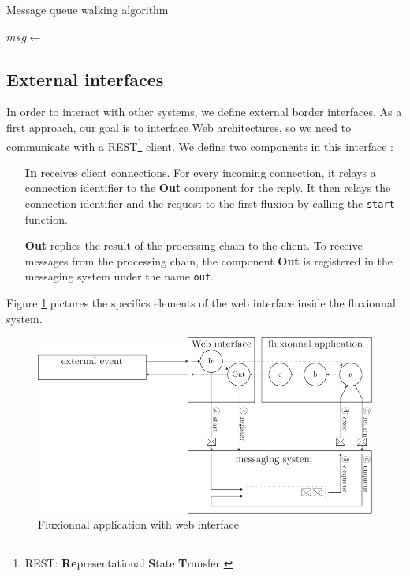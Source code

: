 \begin{algorithm}
\caption{Message queue walking algorithm}
\label{alg:parcours}
\begin{algorithmic}
\State $msg \gets$  
\State {}
\EndWhile
\EndFunction
\end{algorithmic}
\end{algorithm}

\subsection{External interfaces}

In order to interact with other systems, we define external border interfaces.
As a first approach, our goal is to interface Web architectures, so we need to communicate with a REST\footnote{REST: \textbf{Re}presentational \textbf{S}tate \textbf{T}ransfer \cite{Fielding2002}} client.
We define two components in this interface :

\begin{itemize}
	\item[\textbf{In}]
    receives client connections.
    For every incoming connection, it relays a connection identifier to the \textbf{Out} component for the reply.
    It then relays the connection identifier and the request to the first fluxion by calling the \texttt{start} function.
	\item[\textbf{Out}]
    replies the result of the processing chain to the client.
    To receive messages from the processing chain, the component \textbf{Out} is registered in the messaging system under the name \texttt{out}.
\end{itemize}

Figure \ref{fig:schemaweb} pictures the specifics elements of the web interface inside the fluxionnal system.

\begin{figure}[h!]
	\includegraphics[width=\linewidth]{schema-web.pdf}
	\caption{Fluxionnal application with web interface}
	\label{fig:schemaweb}
\end{figure}

